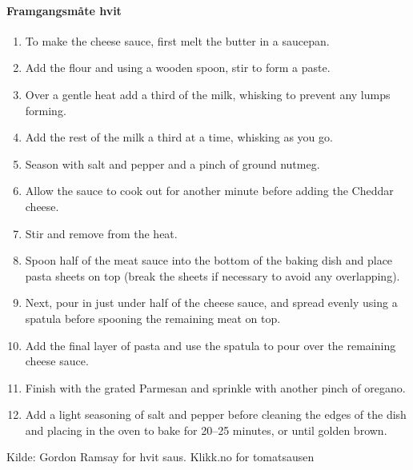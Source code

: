   \paragraph{Framgangsmåte hvit}
  \begin{enumerate}[noitemsep]
  \item To make the cheese sauce, first melt the butter in a saucepan.
  \item Add the flour and using a wooden spoon, stir to form a paste.
  \item Over a gentle heat add a third of the milk, whisking to prevent any lumps forming.
  \item Add the rest of the milk a third at a time, whisking as you go.
  \item Season with salt and pepper and a pinch of ground nutmeg.
  \item Allow the sauce to cook out for another minute before adding the Cheddar cheese.
  \item Stir and remove from the heat.
  \item Spoon half of the meat sauce into the bottom of the baking dish and place pasta sheets on top (break the sheets if necessary to avoid any overlapping).
  \item Next, pour in just under half of the cheese sauce, and spread evenly using a spatula before spooning the remaining meat on top.
  \item Add the final layer of pasta and use the spatula to pour over the remaining cheese sauce.
  \item Finish with the grated Parmesan and sprinkle with another pinch of oregano.
  \item Add a light seasoning of salt and pepper before cleaning the edges of the dish and placing in the oven to bake for 20--25 minutes, or until golden brown.
\end{enumerate}


Kilde: Gordon Ramsay for hvit saus. Klikk.no for tomatsausen
